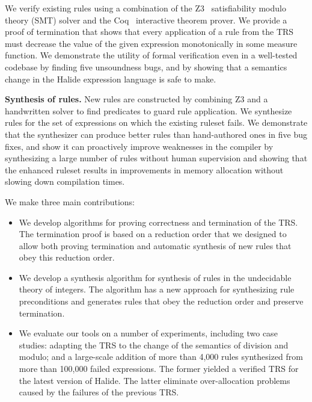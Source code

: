 \documentclass[acmsmall,review,anonymous]{acmart}\settopmatter{printfolios=true,printccs=false,printacmref=false}
\begin{document}


We verify existing rules using a combination of the Z3~\cite{de2008z3}
satisfiability modulo theory (SMT) solver and the Coq~\cite{coq19} interactive
theorem prover. We provide a proof of termination that shows that every application of a rule from the TRS must decrease the value of the given expression monotonically in some measure function. We demonstrate the utility of formal verification even in a well-tested codebase by finding five unsoundness bugs, and by showing that a semantics change in the Halide expression language is safe to make.

\textbf{Synthesis of rules.} New rules are constructed by combining Z3 and a
handwritten solver to find predicates to guard rule application. We 
synthesize rules for the set of expressions on which the 
existing ruleset fails. We demonstrate that the synthesizer can produce better rules than hand-authored ones in five bug fixes, and show it can proactively improve weaknesses in the compiler by synthesizing a large number of rules without human supervision and showing that the enhanced ruleset results in improvements in memory allocation without slowing down compilation times.

We make three main contributions:
\begin{itemize}
  \item We develop algorithms for proving correctness and termination of the TRS. The termination proof is based on a reduction order that we designed to allow both proving termination and automatic synthesis of new rules that obey this reduction order. 
  \item We develop a synthesis algorithm for synthesis of rules in the undecidable theory of integers. 
  The algorithm has a new approach for synthesizing rule preconditions and generates rules that obey the reduction order and preserve termination.

  \item{We evaluate our tools on a number of experiments, including two case studies: adapting the TRS to the change of the semantics of  division and modulo; and a large-scale addition of more than 4,000 rules synthesized from more than 100,000 failed expressions. The former yielded a verified TRS for the latest version of Halide.  The latter eliminate over-allocation problems caused by the failures of the previous TRS.}
\end{itemize}
\end{document}
